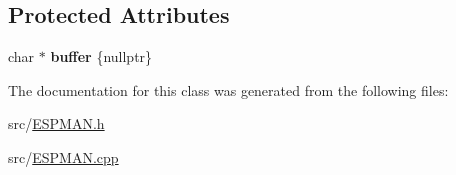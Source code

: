 \subsection*{Protected Attributes}
\begin{DoxyCompactItemize}
\item 
\mbox{\label{class_e_s_p_m_a_n_1_1my_string_af25573b872653fe4b868a41b21336466}} 
char $\ast$ {\bfseries buffer} \{nullptr\}
\end{DoxyCompactItemize}


The documentation for this class was generated from the following files\+:\begin{DoxyCompactItemize}
\item 
src/\hyperlink{_e_s_p_m_a_n_8h}{E\+S\+P\+M\+A\+N.\+h}\item 
src/\hyperlink{_e_s_p_m_a_n_8cpp}{E\+S\+P\+M\+A\+N.\+cpp}\end{DoxyCompactItemize}
